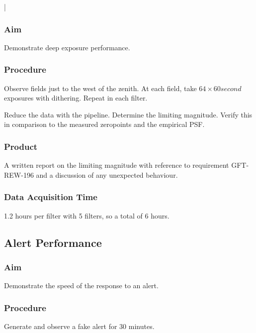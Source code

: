 |\documentclass{article}
\begin{document}
\subsubsection{Aim}

Demonstrate deep exposure performance.

\subsubsection{Procedure}

Observe fields just to the west of the zenith. At each field, take $64 \times 60 second$ exposures with dithering. Repeat in each filter.

Reduce the data with the pipeline. Determine the limiting magnitude. Verify this in comparison to the measured zeropoints and the empirical PSF.

\subsubsection{Product}

A written report on the limiting magnitude with reference to requirement GFT-REW-196 and a discussion of any unexpected behaviour.

\subsubsection{Data Acquisition Time}

1.2 hours per filter with 5 filters, so a total of 6 hours.


\subsection{Alert Performance}

\subsubsection{Aim}

Demonstrate the speed of the response to an alert.

\subsubsection{Procedure}

Generate and observe a fake alert for 30 minutes.
\end{document}
